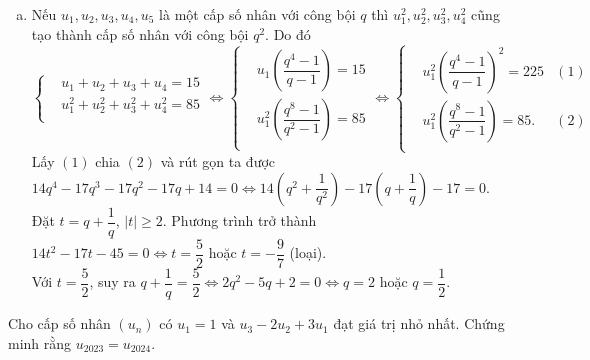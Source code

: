 \begin{bt}
{\begin{enumerate}[a)]
			\item Nếu $u_1,u_2,u_3,u_4,u_5$ là một cấp số nhân với công bội $q$ thì $u_1^2,u_2^2,u_3^2,u_4^2$ cũng tạo thành cấp số nhân với công bội $q^2$. Do đó\\ $\left\{\begin{aligned} 
				&u_1+u_2+u_3+u_4=15 \\ 
				&u_1^2+u_2^2+u_3^2+u_4^2=85 \\
			\end{aligned}\right. \Leftrightarrow \left\{\begin{aligned} 
				&u_1\left(\dfrac{q^4-1}{q-1}\right)=15 \\ 
				&u_1^2\left(\dfrac{q^8-1}{q^2-1}\right)=85 \\
			\end{aligned}\right. \Leftrightarrow \left\{\begin{aligned}& u_1^2{\left(\dfrac{q^4-1}{q-1}\right)}^2=225 & (1) \\ & u_1^2\left(\dfrac{q^8-1}{q^2-1}\right)=85. & (2) \\ \end{aligned}\right. $ \\ 
			Lấy $(1)$ chia $(2)$ và rút gọn ta được\\ $14q^4-17q^3-17q^2-17q+14=0 \Leftrightarrow 14\left(q^2+\dfrac{1}{q^2}\right)-17\left(q+\dfrac{1}{q}\right)-17=0$. \\ 
			Đặt $t=q+\dfrac{1}{q}$, $\left|t\right|\geqslant 2$. Phương trình trở thành\\ $14t^2-17t-45=0 \Leftrightarrow t=\dfrac{5}{2}$ hoặc $t=-\dfrac{9}{7}$ (loại). \\ 
			Với $t=\dfrac{5}{2}$, suy ra $q+\dfrac{1}{q}=\dfrac{5}{2} \Leftrightarrow 2q^2-5q+2=0 \Leftrightarrow q=2$ hoặc $q=\dfrac{1}{2}$. 
		\end{enumerate}
	}
\end{bt}

\begin{bt}%

Cho cấp số nhân $\left(u_n\right)$ có $u_1=1$ và $u_3-2u_2+3u_1$ đạt giá trị nhỏ nhất. Chứng minh rằng $u_{2023}=u_{2024}$.
\end{bt}

